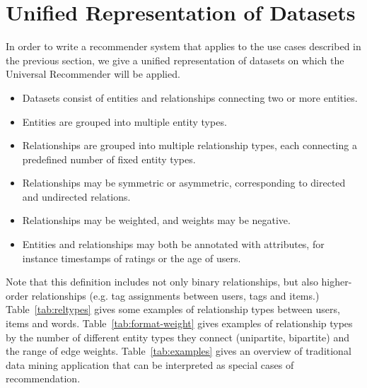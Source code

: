 \documentclass{article}
\begin{document}
\section{Unified Representation of Datasets}
In order to write a recommender system that applies to the use cases
described in the previous section, we give a unified representation of
datasets on which the Universal Recommender will be applied. 

\begin{itemize}
\item Datasets consist of entities and relationships connecting two or
  more entities.  
\item Entities are grouped into multiple entity types. 
\item Relationships are grouped into multiple relationship types, each
  connecting a predefined number of fixed entity types.
\item Relationships may be symmetric or asymmetric, corresponding to
  directed and undirected relations. 
\item Relationships may be weighted, and weights may be negative. 
\item Entities and relationships may both be annotated with attributes,
  for instance timestamps of ratings or the age of users. 
\end{itemize}

Note that this definition includes not only binary relationships, but
also higher-order relationships (e.g. tag assignments between users,
tags and items.)
Table~\ref{tab:reltypes} gives some examples of relationship types
between users, items and words. 
Table~\ref{tab:format-weight} gives examples of relationship types by
the number of different entity types they connect (unipartite,
bipartite) and the range of edge weights. 
Table~\ref{tab:examples} gives an overview of traditional data mining
application that can be interpreted as special cases of recommendation. 
\end{document}
